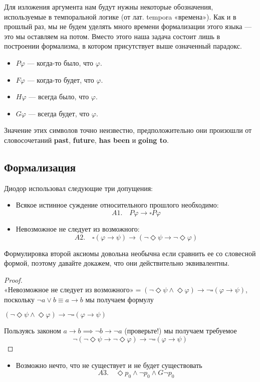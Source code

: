 \documentclass[openany]{book}
\theoremstyle{plain}
\theoremstyle{definition}
\begin{document}
Для изложения аргумента нам будут нужны некоторые обозначения, используемые в темпоральной логике (от лат. tempora «времена»). Как и в прошлый раз, мы не будем уделять много времени формализации этого языка — это мы оставляем на потом. Вместо этого наша задача состоит лишь в построении формализма, в котором присутствует выше означенный парадокс.

\begin{itemize}
    \item \(P\varphi\) — когда-то было, что \(\varphi\).
    \item \(F\varphi\) — когда-то будет, что \(\varphi\).
    \item \(H\varphi\) — всегда было, что \(\varphi\).
    \item \(G\varphi\) — всегда будет, что \(\varphi\).
\end{itemize}

Значение этих символов точно неизвестно, предположительно они произошли от словосочетаний \textbf{past}, \textbf{future}, \textbf{has been} и \textbf{going to}. 

\subsection{Формализация}

Диодор использовал следующие три допущения:

\begin{itemize}
    \item Всякое истинное суждение относительного прошлого необходимо:
	\[A1. \quad P\varphi \to \square P\varphi \]
    \item Невозможное не следует из возможного:
	\[A2. \quad \square(\varphi \to \psi) \to (\neg \Diamond \psi \to \neg \Diamond \varphi)\]
\end{itemize}

Формулировка второй аксиомы довольна необычна если сравнить ее со словесной формой, поэтому давайте докажем, что они действительно эквивалентны.
\begin{proof}

    \(\text{«Невозможное не следует из возможного»} = (\neg \Diamond \psi \land \Diamond \varphi) \to \neg \square (\varphi \to \psi)\), поскольку \(\neg a \lor b \equiv a \to b\) мы получаем формулу

    \((\neg \Diamond \psi \land \Diamond \varphi) \to \neg \square (\varphi \to \psi)\)

    Пользуясь законом \(a \to b \implies \neg b \to \neg a\) (проверьте!) мы получаем требуемое
    $$\neg(\neg \Diamond \psi \to \neg \Diamond \varphi) \to \neg \square (\varphi \to \psi)$$
\end{proof}
\begin{itemize}
    \item Возможно нечто, что не существует и не будет существовать
	\[A3. \quad \Diamond p_0 \land \neg p_0 \land G\neg p_0\]
\end{itemize}
\end{document}
